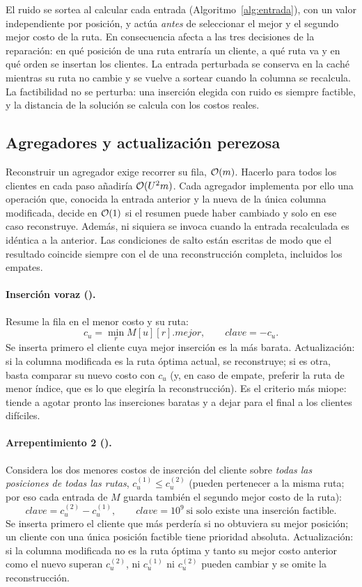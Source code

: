 El ruido se sortea al calcular cada entrada (Algoritmo~\ref{alg:entrada}), con un valor
independiente por posición, y actúa \emph{antes} de seleccionar el mejor y el segundo mejor
costo de la ruta. En consecuencia afecta a las tres decisiones de la reparación: en qué
posición de una ruta entraría un cliente, a qué ruta va y en qué orden se insertan los
clientes. La entrada perturbada se conserva en la caché mientras su ruta no cambie y se
vuelve a sortear cuando la columna se recalcula. La factibilidad no se perturba: una
inserción elegida con ruido es siempre factible, y la distancia de la solución se calcula con
los costos reales.

\subsection{Agregadores y actualización perezosa}
\label{sec:agregadores}

Reconstruir un agregador exige recorrer su fila, $\mathcal{O}(m)$. Hacerlo para todos los clientes
en cada paso añadiría $\mathcal{O}(U^2 m)$. Cada agregador implementa por ello una operación
 que, conocida la entrada anterior y la nueva de la única columna modificada,
decide en $\mathcal{O}(1)$ si el resumen puede haber cambiado y solo en ese caso reconstruye. Además,
 ni siquiera se invoca cuando la entrada recalculada es idéntica a la anterior.
Las condiciones de salto están escritas de modo que el resultado coincide siempre con el de
una reconstrucción completa, incluidos los empates.

\paragraph{Inserción voraz ().} Resume la fila en el menor costo y su ruta:
\[
c_u=\min_r M[u][r].\textit{mejor},\qquad \textit{clave}=-c_u .
\]
Se inserta primero el cliente cuya mejor inserción es la más barata. Actualización: si la
columna modificada es la ruta óptima actual, se reconstruye; si es otra, basta comparar su
nuevo costo con $c_u$ (y, en caso de empate, preferir la ruta de menor índice, que es lo que
elegiría la reconstrucción). Es el criterio más miope: tiende a agotar pronto las inserciones
baratas y a dejar para el final a los clientes difíciles.

\paragraph{Arrepentimiento 2 ().} Considera los dos menores costos de
inserción del cliente sobre \emph{todas las posiciones de todas las rutas}, $c^{(1)}_u\le
c^{(2)}_u$ (pueden pertenecer a la misma ruta; por eso cada entrada de $M$ guarda también el
segundo mejor costo de la ruta):
\[
\textit{clave}=c^{(2)}_u-c^{(1)}_u,\qquad \textit{clave}=10^{9}\ \text{si solo existe una inserción factible.}
\]
Se inserta primero el cliente que más perdería si no obtuviera su mejor posición; un cliente
con una única posición factible tiene prioridad absoluta. Actualización: si la columna
modificada no es la ruta óptima y tanto su mejor costo anterior como el nuevo superan
$c^{(2)}_u$, ni $c^{(1)}_u$ ni $c^{(2)}_u$ pueden cambiar y se omite la reconstrucción.

